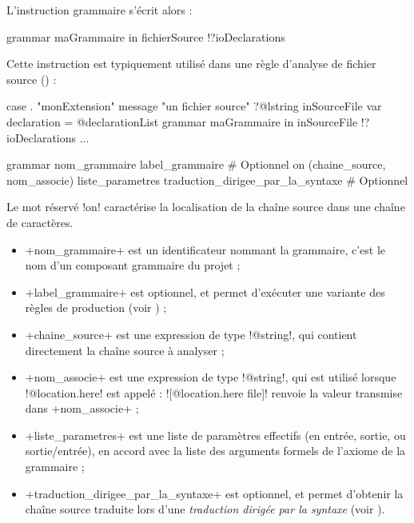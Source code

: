 L'instruction grammaire s'écrit alors :
\begin{galgas}
grammar maGrammaire in fichierSource !?ioDeclarations
\end{galgas}

Cette instruction est typiquement utilisé dans une règle d'analyse de fichier source () :

\begin{galgas}
case . "monExtension"
message "un fichier source"
?@lstring inSourceFile {
  var declaration = @declarationList {}
  grammar maGrammaire in inSourceFile !?ioDeclarations
  ...
}
\end{galgas}




\begin{galgasbox}
grammar
  nom_grammaire
  label_grammaire # Optionnel
  on (chaine_source, nom_associe)
  liste_parametres
  traduction_dirigee_par_la_syntaxe # Optionnel
\end{galgasbox}

Le mot réservé \ggs!on! caractérise la localisation de la chaîne source dans une chaîne de caractères.
\begin{itemize}
  \item \ggs+nom_grammaire+ est un identificateur nommant la grammaire, c'est le nom d'un composant grammaire du projet ;
  \item \ggs+label_grammaire+ est optionnel, et permet d'exécuter une variante des règles de production (voir ) ;
  \item \ggs+chaine_source+ est une expression de type \ggs!@string!, qui contient directement la chaîne source à analyser ;
  \item \ggs+nom_associe+ est une expression de type \ggs!@string!, qui est utilisé lorsque \ggs!@location.here! est appelé : \ggs![@location.here file]! renvoie la valeur transmise dans \ggs+nom_associe+ ;
  \item \ggs+liste_parametres+ est une liste de paramètres effectifs (en entrée, sortie, ou sortie/entrée), en accord avec la liste des arguments formels de l'axiome de la grammaire ;
  \item \ggs+traduction_dirigee_par_la_syntaxe+ est optionnel, et permet d'obtenir la chaîne source traduite lors d'une \emph{traduction dirigée par la syntaxe} (voir ).
\end{itemize}
















